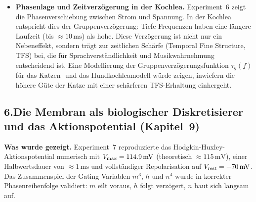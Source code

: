﻿\documentclass[12pt,a4paper,titlepage]{report}
\begin{document}
\begin{itemize}[leftmargin=2em]
    Das optimale Impedanzanpassungs-Design (Hebelarm + Flächenverhältnis)
    aus Sicht der Informationstheorie â€” Maximierung der Kanalkapazität
    bei minimalem mechanischen Energieverlust â€” wäre ein direktes
    Bindestück zwischen Kapitel~5 und Kapitel~6.
  \item \textbf{Phasenlage und Zeitverzögerung in der Kochlea.}
    Experiment~6 zeigt die Phasenverschiebung zwischen Strom und Spannung.
    In der Kochlea entspricht dies der Gruppenver\-zögerung:
    Tiefe Frequenzen haben eine längere Laufzeit (bis $\approx 10\,\mathrm{ms}$)
    als hohe.
    Diese Verzögerung ist nicht nur ein Nebeneffekt, sondern
    trägt zur zeitlichen Schärfe (Temporal Fine Structure, TFS) bei,
    die für Sprachverständlichkeit und Musikwahrnehmung entscheidend ist.
    Eine Modellierung der Gruppenver\-zögerungsfunktion $\tau_g(f)$
    für das Katzen- und das Hundkochleamodell würde zeigen,
    inwiefern die höhere Güte der Katze mit einer schärferen
    TFS-Erhaltung einhergeht.
\end{itemize}

\subsection*{6.\enspace Die Membran als biologischer Diskretisierer
und das Aktionspotential (Kapitel~9)}

\textbf{Was wurde gezeigt.}
Experiment~7 reproduzierte das Hodgkin-Huxley-Aktionspotential numerisch
mit $V_{\max}=\SI{114{,}9}{\milli\volt}$ (theoretisch $\approx 115\,\mathrm{mV}$),
einer Halbwertsdauer von $\approx 1\,\mathrm{ms}$ und vollständiger
Repolarisation auf $V_{\rm rest}=-70\,\mathrm{mV}$.
Das Zusammenspiel der Gating-Variablen $m^3$, $h$ und $n^4$ wurde
in korrekter Phasenreihenfolge validiert: $m$ eilt voraus, $h$ folgt
verzögert, $n$ baut sich langsam auf.
\end{document}
